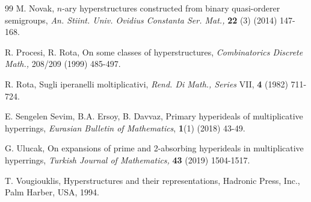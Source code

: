 \documentclass[preprint,review,10pt]{amsart}
\theoremstyle{definition}
\theoremstyle{remark}
\numberwithin{equation}{section}
\begin{document}
\begin{thebibliography}{99}
M. Novak, $n$-ary hyperstructures constructed from binary quasi-orderer semigroups, {\it An. Stiint. Univ. Ovidius Constanta Ser. Mat.,} {\bf 22} (3)
(2014) 147-168.

R. Procesi, R. Rota, On some classes of hyperstructures, {\it Combinatorics
Discrete Math.,} 208/209 (1999) 485-497.


R. Rota, Sugli iperanelli moltiplicativi, {\it Rend. Di Math., Series} VII, {\bf 4} (1982) 711-724.

E. Sengelen Sevim, B.A. Ersoy,  B. Davvaz, Primary hyperideals of multiplicative hyperrings, {\it Eurasian Bulletin of Mathematics}, {\bf 1}(1) (2018) 43-49.



G. Ulucak, On expansions of prime and 2-absorbing hyperideals in multiplicative hyperrings, {\it Turkish Journal of Mathematics,} {\bf 43} (2019) 1504-1517.


T. Vougiouklis, Hyperstructures and their representations, Hadronic Press, Inc., Palm Harber, USA, 1994.






\end{thebibliography}
\end{document}
